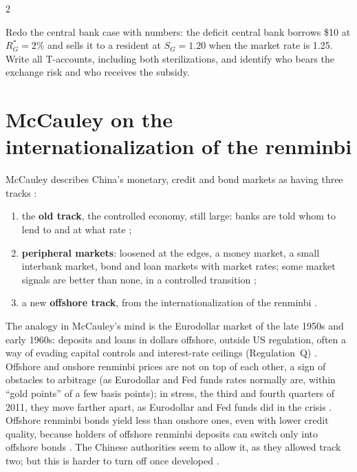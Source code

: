 \begin{paracol}{2}
\begin{exercise}
Redo the central bank case with numbers: the deficit central bank borrows \$10 at $R^\ast_G=2\%$ and sells it to a resident at $S_G=1.20$ when the market rate is
1.25. Write all T-accounts, including both sterilizations, and identify who bears the exchange risk and who receives the subsidy.
\end{exercise}

\section{McCauley on the internationalization of the renminbi}\label{sec:fx-rmb}

\begin{reading}
McCauley describes China's monetary, credit and bond markets as having three tracks :
\begin{enumerate}
  \item the \textbf{old track}, the controlled economy, still large: banks are told whom to lend to and at what rate ;
  \item \textbf{peripheral markets}: loosened at the edges, a money market, a small interbank market, bond and loan markets with market rates; some market
        signals are better than none, in a controlled transition ;
  \item a new \textbf{offshore track}, from the internationalization of the renminbi .
\end{enumerate}
\end{reading}

The analogy in McCauley's mind is the Eurodollar market of the late 1950s and early 1960s: deposits and loans in dollars offshore, outside US regulation, often a
way of evading capital controls and interest-rate ceilings (Regulation~Q) . Offshore and onshore
renminbi prices are not on top of each other, a sign of obstacles to arbitrage (as Eurodollar and Fed funds rates normally are, within ``gold points'' of a few
basis points); in stress, the third and fourth quarters of 2011, they move farther apart, as Eurodollar and Fed funds did in the crisis
. Offshore renminbi bonds yield less than onshore ones, even with lower credit quality, because
holders of offshore renminbi deposits can switch only into offshore bonds . The Chinese authorities seem to allow it, as they
allowed track two; but this is harder to turn off once developed .


\end{paracol}
